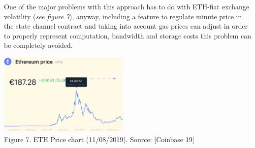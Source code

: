 \documentclass[12pt]{amsart}
\begin{document}
\begin{multicols}{2}
\vspace{0.35cm}

One of the major problems with this approach has to do
with ETH-fiat exchange volatility
(\textit{see figure 7}), anyway, including
a feature to regulate minute price in the state channel
contract and taking into account gas prices can adjust
in order to properly
represent computation, bandwidth and storage costs this
problem can be completely avoided.

\begin{center}
  \includegraphics[keepaspectratio, width=0.481125\textwidth]{images/ethcurrentprice-sourcecoinbase.eps}
\\
Figure 7. ETH Price chart (11/08/2019). Source: [Coinbase 19]
\\
\end{center}


\end{multicols}
\end{document}
